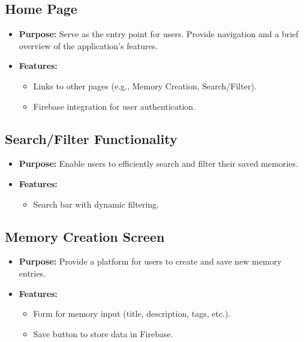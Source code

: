 \documentclass[12pt]{article}
\begin{document}
\subsection{Home Page}
\begin{itemize}
    \item \textbf{Purpose:} Serve as the entry point for users. Provide navigation and a brief overview of the application's features.
    \item \textbf{Features:}
    \begin{itemize}
        \item Links to other pages (e.g., Memory Creation, Search/Filter).
        \item Firebase integration for user authentication.
    \end{itemize}
\end{itemize}

\subsection{Search/Filter Functionality}
\begin{itemize}
    \item \textbf{Purpose:} Enable users to efficiently search and filter their saved memories.
    \item \textbf{Features:}
    \begin{itemize}
        \item Search bar with dynamic filtering.
    \end{itemize}
\end{itemize}

\subsection{Memory Creation Screen}
\begin{itemize}
    \item \textbf{Purpose:} Provide a platform for users to create and save new memory entries.
    \item \textbf{Features:}
    \begin{itemize}
        \item Form for memory input (title, description, tags, etc.).
        \item Save button to store data in Firebase.
    \end{itemize}
\end{itemize}
\end{document}
